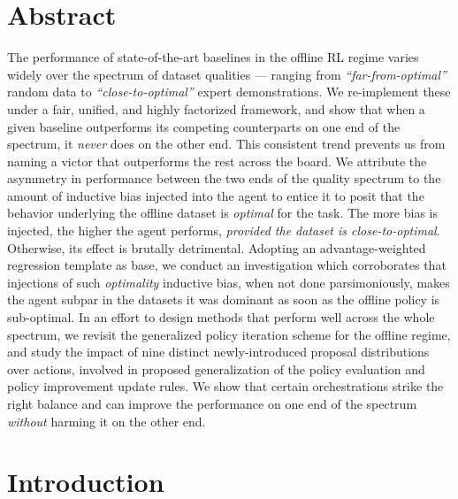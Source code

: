 

\section*{Abstract}

The performance of state-of-the-art baselines in the offline RL regime varies widely over the
spectrum of dataset qualities --- ranging from \textit{``far-from-optimal''} random data
to \textit{``close-to-optimal''} expert demonstrations.
We re-implement these under a fair, unified, and highly factorized framework,
and show that when a given baseline outperforms its competing counterparts
on one end of the spectrum, it \emph{never} does on the other end.
This consistent trend prevents us from naming a victor that outperforms the rest across the board.
We attribute the asymmetry in performance between the two ends of the quality spectrum to
the amount of inductive bias injected into the agent to entice it to posit that the behavior underlying
the offline dataset is \emph{optimal} for the task.
The more bias is injected, the higher the agent performs, \emph{provided the dataset is close-to-optimal}.
Otherwise, its effect is brutally detrimental.
Adopting an advantage-weighted regression template as base, we conduct an investigation which corroborates that
injections of such \emph{optimality} inductive bias, when not done parsimoniously,
makes the agent subpar in the datasets it was dominant as soon as the offline policy is sub-optimal.
In an effort to design methods that perform well across the whole spectrum,
we revisit the generalized policy iteration scheme for the offline regime, and study the impact of nine distinct
newly-introduced proposal distributions over actions, involved in proposed generalization of the
policy evaluation and policy improvement update rules.
We show that certain orchestrations strike the right balance and can improve the performance on one end of the spectrum
\emph{without} harming it on the other end.

\section{Introduction}
\label{introoffline}

